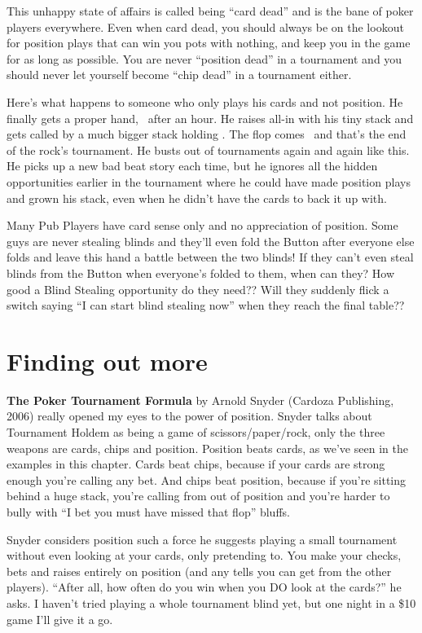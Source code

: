 This unhappy state of affairs is called being ``card dead'' and is
the bane of poker players everywhere. Even when card dead, you should always
be on the lookout for position plays that can win you pots with nothing,
and keep you in the game for as long as possible. You are never
``position dead'' in a tournament and you should never let yourself
become ``chip dead'' in a tournament either.

Here's what happens to someone who only plays his cards and not position.
He finally gets a proper hand, \tenh\tenc\ after an hour. He raises all-in
with his tiny stack and gets called by a much bigger stack
holding \Kd\Qd. The flop comes \Kh\sixc\trec\ and that's the
end of the rock's tournament. He busts out of tournaments again and
again like this. He picks up a new bad beat story each time, but he
ignores all the hidden opportunities earlier in the tournament
where he could have made position plays and grown his stack,
even when he didn't have the cards to back it up with.

Many Pub Players have card sense only and no appreciation of position.
Some guys are never stealing blinds and they'll even fold the
Button after everyone else folds and leave this hand a battle between the
two blinds! If they can't even steal blinds from the Button when everyone's
folded to them, when can they? How good a Blind Stealing opportunity do
they need?? Will they suddenly flick a switch saying ``I can start
blind stealing now'' when they reach the final table??

\section{Finding out more}

\textbf{The Poker Tournament Formula} by Arnold Snyder
(Cardoza Publishing, 2006) really opened my eyes to the power of position.
Snyder talks about
Tournament Holdem as being a game of scissors/paper/rock, only the
three weapons are cards, chips and position. Position beats cards, as we've
seen in the examples in this chapter. Cards beat chips, because if your
cards are strong enough you're calling any bet. And chips beat position,
because if you're sitting behind a huge stack, you're calling
from out of position and you're harder to bully with ``I bet you
must have missed that flop'' bluffs.

Snyder considers position such a force he suggests playing a small
tournament without even looking at your cards, only pretending to. You make
your checks, bets and raises entirely on position (and any tells you can
get from the other players). ``After all, how often do you win when you
DO look at the cards?'' he asks. I haven't tried playing a whole tournament
blind yet, but one night in a \$10 game I'll give it a go.

